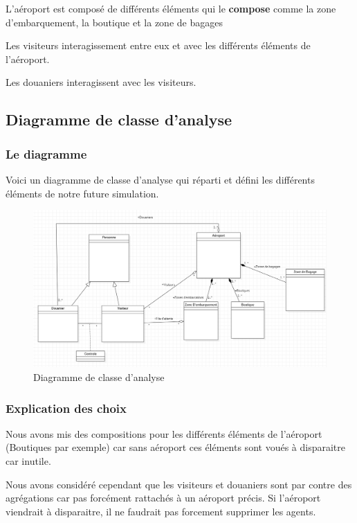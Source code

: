 \documentclass[12pt,french]{article} %
\begin{document}
L'aéroport est composé de différents éléments qui le \textbf{compose} comme la zone d'embarquement, la boutique et la zone de bagages

Les visiteurs interagissement entre eux et avec les différents éléments de l'aéroport.

Les douaniers interagissent avec les visiteurs. 


\subsection{Diagramme de classe d'analyse}

\subsubsection{Le diagramme}

Voici un diagramme de classe d'analyse qui réparti et défini les différents éléments de notre future simulation.

\begin{figure}[H]
	\centering
	\includegraphics[scale=0.4]{analyse.png}
	\caption{Diagramme de classe d'analyse}    
\end{figure}

\subsubsection{Explication des choix}

Nous avons mis des compositions pour les différents éléments de l'aéroport (Boutiques par exemple) car sans aéroport ces éléments sont voués à disparaitre car inutile.

Nous avons considéré cependant que les visiteurs et douaniers sont par contre des agrégations car pas forcément rattachés à un aéroport précis. Si l'aéroport viendrait à disparaitre, il ne faudrait pas forcement supprimer les agents.
\end{document}
